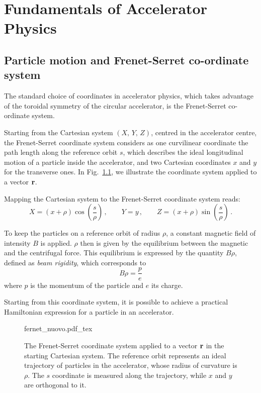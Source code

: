 
\chapter{Fundamentals of Accelerator Physics}\label{ch:accelerator_physics_fundamentals}

\section{Particle motion and Frenet-Serret co-ordinate system}

The standard choice of coordinates in accelerator physics, which takes advantage of the toroidal symmetry of the circular accelerator, is the Frenet-Serret co-ordinate system.

Starting from the Cartesian system $(X,\, Y,\, Z)$, centred in the accelerator centre, the Frenet-Serret coordinate system considers as one curvilinear coordinate the path length along the reference orbit $s$, which describes the ideal longitudinal motion of a particle inside the accelerator, and two Cartesian coordinates $x$ and $y$ for the transverse ones. In Fig.~\ref{fig:frenserr}, we illustrate the coordinate system applied to a vector $\vb{r}$.

Mapping the Cartesian system to the Frenet-Serret coordinate system reads:
%
\begin{equation} 
    X = (x+\rho)\cos(\frac{s}{\rho})\,, \qquad Y=y\,, \qquad Z=(x+\rho)\sin(\frac{s}{\rho})\,.
\end{equation}

To keep the particles on a reference orbit of radius $\rho$, a constant magnetic field of intensity $B$ is applied. $\rho$ then is given by the equilibrium between the magnetic and the centrifugal force. This equilibrium is expressed by the quantity $B\rho$, defined as \textit{beam rigidity}, which corresponds to
\begin{equation}
    B\rho = \frac{p}{e}
    \label{eq:beam_rigidity}
\end{equation}
where $p$ is the momentum of the particle and $e$ its charge.

Starting from this coordinate system, it is possible to achieve a practical Hamiltonian expression for a particle in an accelerator.

\begin{figure}
\centering
\def\svgwidth{0.75\columnwidth}
{fernet_nuovo.pdf_tex}
\caption{The Frenet-Serret coordinate system applied to a vector $\vb{r}$ in the starting Cartesian system. The reference orbit represents an ideal trajectory of particles in the accelerator, whose radius of curvature is $\rho$. The $s$ coordinate is measured along the trajectory, while $x$ and $y$ are orthogonal to it.}
\label{fig:frenserr}
\end{figure}

